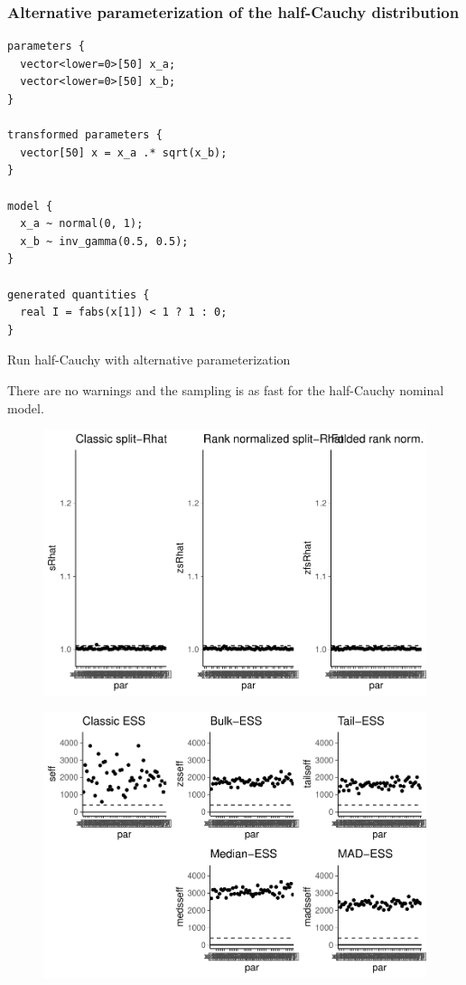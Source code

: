 \documentclass[american,]{article}
\begin{document}
\hypertarget{alternative-parameterization-of-the-half-cauchy-distribution}{%
\subsubsection*{Alternative parameterization of the half-Cauchy
distribution}\label{alternative-parameterization-of-the-half-cauchy-distribution}}

\begin{verbatim}
parameters {
  vector<lower=0>[50] x_a;
  vector<lower=0>[50] x_b;
}

transformed parameters {
  vector[50] x = x_a .* sqrt(x_b);
}

model {
  x_a ~ normal(0, 1);
  x_b ~ inv_gamma(0.5, 0.5);
}

generated quantities {
  real I = fabs(x[1]) < 1 ? 1 : 0;
}
\end{verbatim}

Run half-Cauchy with alternative parameterization

There are no warnings and the sampling is as fast for the half-Cauchy
nominal model.

\begin{figure}[tp]
  \centering
  \includegraphics[width=0.6\linewidth]{graphics/rhat-fit-half-reparam-1.pdf}
\end{figure}

\begin{figure}[tp]
  \centering
  \includegraphics[width=0.6\linewidth]{graphics/ess-fit-half-reparam-1.pdf}
\end{figure}
\end{document}
